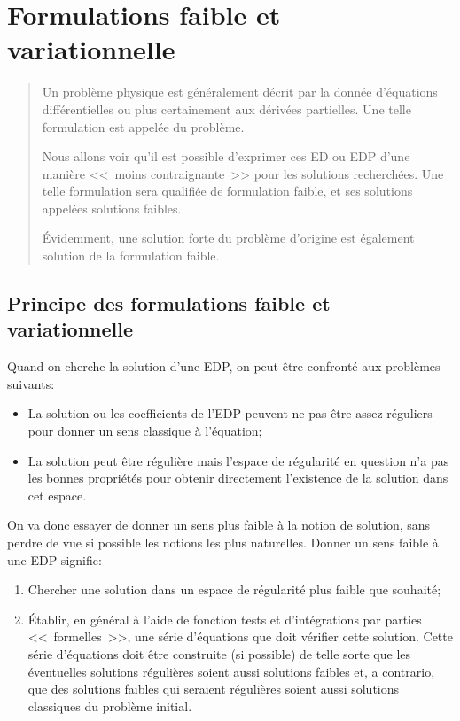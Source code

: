 \chapter{Formulations faible et variationnelle}\label{Ch_FFaible}
\begin{abstract}
Un problème physique est généralement décrit par la donnée
d'équations différentielles ou plus certainement aux dérivées partielles.
Une telle formulation est appelée  du problème.

Nous allons voir qu'il est possible d'exprimer ces ED ou EDP d'une manière
<<~moins contraignante~>> pour les solutions recherchées.
Une telle formulation sera qualifiée de formulation faible, et ses
solutions appelées solutions faibles.

Évidemment, une solution forte du problème d'origine est également solution de
la formulation faible.
\end{abstract}


\medskip
\section{Principe des formulations faible et variationnelle}
Quand on cherche la solution d'une EDP, on peut être confronté aux problèmes suivants:
\begin{itemize}
   \item La solution ou les coefficients de l'EDP peuvent ne pas être assez réguliers pour donner
	un sens classique à l'équation;
   \item La solution peut être régulière mais l'espace de régularité en question n'a pas les
	bonnes propriétés pour obtenir directement l'existence de la solution dans cet espace.
\end{itemize}


\medskip



On va donc essayer de donner un sens plus faible à la notion de solution, sans perdre de vue si
possible les notions les plus naturelles. Donner un sens faible à une EDP signifie:
\begin{enumerate}
   \item Chercher une solution dans un espace de régularité plus faible que souhaité;
   \item Établir, en général à l'aide de fonction tests et d'intégrations par parties <<~formelles~>>,
	une série d'équations que doit vérifier cette solution.
	Cette série d'équations doit être construite (si possible) de telle sorte que les éventuelles
	solutions régulières soient aussi solutions faibles et, a contrario, que des solutions faibles
	qui seraient régulières soient aussi solutions classiques du problème initial.
\end{enumerate}


